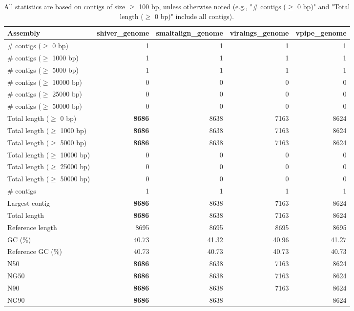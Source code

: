 \documentclass[12pt,a4paper]{article}
\begin{document}
\begin{table}[ht]
\begin{center}
\caption{All statistics are based on contigs of size $\geq$ 100 bp, unless otherwise noted (e.g., "\# contigs ($\geq$ 0 bp)" and "Total length ($\geq$ 0 bp)" include all contigs).}
\begin{tabular}{|l*{4}{|r}|}
\hline
Assembly & shiver\_genome & smaltalign\_genome & viralngs\_genome & vpipe\_genome \\ \hline
\# contigs ($\geq$ 0 bp) & 1 & 1 & 1 & 1 \\ \hline
\# contigs ($\geq$ 1000 bp) & 1 & 1 & 1 & 1 \\ \hline
\# contigs ($\geq$ 5000 bp) & 1 & 1 & 1 & 1 \\ \hline
\# contigs ($\geq$ 10000 bp) & 0 & 0 & 0 & 0 \\ \hline
\# contigs ($\geq$ 25000 bp) & 0 & 0 & 0 & 0 \\ \hline
\# contigs ($\geq$ 50000 bp) & 0 & 0 & 0 & 0 \\ \hline
Total length ($\geq$ 0 bp) & {\bf 8686} & 8638 & 7163 & 8624 \\ \hline
Total length ($\geq$ 1000 bp) & {\bf 8686} & 8638 & 7163 & 8624 \\ \hline
Total length ($\geq$ 5000 bp) & {\bf 8686} & 8638 & 7163 & 8624 \\ \hline
Total length ($\geq$ 10000 bp) & 0 & 0 & 0 & 0 \\ \hline
Total length ($\geq$ 25000 bp) & 0 & 0 & 0 & 0 \\ \hline
Total length ($\geq$ 50000 bp) & 0 & 0 & 0 & 0 \\ \hline
\# contigs & 1 & 1 & 1 & 1 \\ \hline
Largest contig & {\bf 8686} & 8638 & 7163 & 8624 \\ \hline
Total length & {\bf 8686} & 8638 & 7163 & 8624 \\ \hline
Reference length & 8695 & 8695 & 8695 & 8695 \\ \hline
GC (\%) & 40.73 & 41.32 & 40.96 & 41.27 \\ \hline
Reference GC (\%) & 40.73 & 40.73 & 40.73 & 40.73 \\ \hline
N50 & {\bf 8686} & 8638 & 7163 & 8624 \\ \hline
NG50 & {\bf 8686} & 8638 & 7163 & 8624 \\ \hline
N90 & {\bf 8686} & 8638 & 7163 & 8624 \\ \hline
NG90 & {\bf 8686} & 8638 & - & 8624 \\ \hline

\end{tabular}
\end{center}
\end{table}
\end{document}
